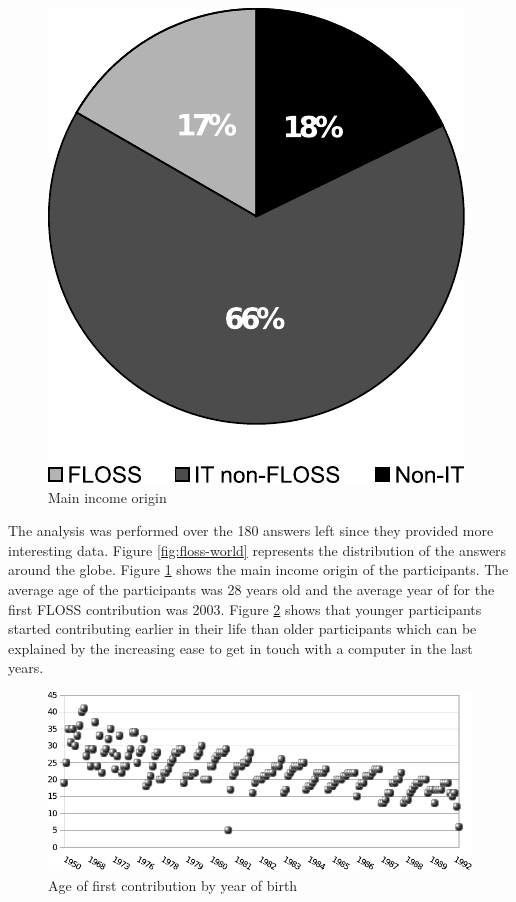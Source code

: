 \documentclass[lnbip]{svmultln}
\begin{document}
\begin{figure}[htb]
\begin{minipage}[t]{0.5\linewidth}
    \includegraphics[scale=0.8]{floss-income.pdf}
    \caption{Main income origin}
    \label{fig:floss-income}
  \end{minipage}
\end{figure}

The analysis was performed over the 180 answers left since they
provided more interesting data. Figure \ref{fig:floss-world}
represents the distribution of the answers around the globe. Figure
\ref{fig:floss-income} shows the main income origin of the
participants. The average age of the participants was 28 years old and
the average year of for the first FLOSS contribution was 2003. Figure
\ref{fig:floss-firstxp} shows that younger participants started
contributing earlier in their life than older participants which can
be explained by the increasing ease to get in touch with a computer in
the last years.

\begin{figure}[htb]
  \centering
  \includegraphics[scale=.9]{floss-firstxp.pdf}
  \caption{Age of first contribution by year of birth}
  \label{fig:floss-firstxp}
\end{figure}
\end{document}
